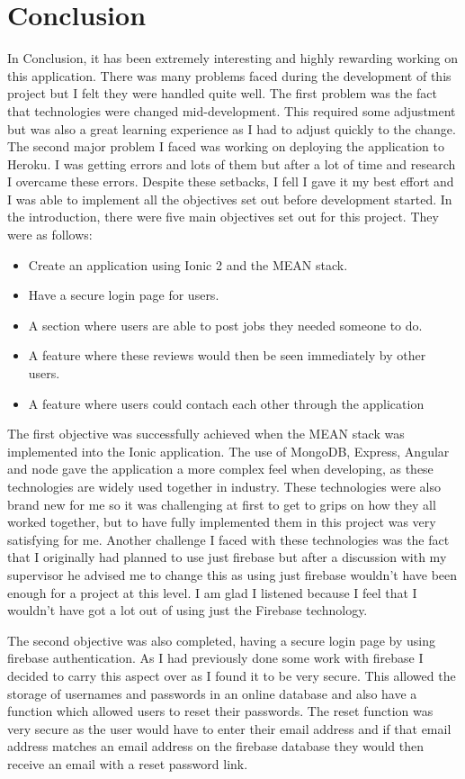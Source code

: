 \chapter{Conclusion}
In Conclusion, it has been extremely interesting and highly rewarding working on this application. There was many problems faced during the development of this project but I felt they were handled  quite well. The first problem was the fact that technologies were changed mid-development. This required some adjustment but was also a great learning experience as I had to adjust quickly to the change. The second major problem I faced was working on deploying the application to Heroku. I was getting errors and lots of them but after a lot of time and research I overcame these errors. Despite these setbacks, I fell I gave it my best effort and I was able to implement all the objectives set out before development started. In the introduction, there were five main objectives set out for this project. They were as follows:
\begin{itemize}
	\item Create an application using Ionic 2 and the MEAN stack.
	\item Have a secure login page for users.
	\item A section where users are able to post jobs they needed someone to do.
	\item A feature where these reviews would then be seen immediately by other users. 
              \item A feature where users could contach each other through the application
\end{itemize}
The first objective was successfully achieved when the MEAN stack was implemented into the Ionic application. The use of MongoDB, Express, Angular and node gave the application a more complex feel when developing, as these technologies are widely used together in industry. These technologies were also brand new for me so it was challenging at first to get to grips on how they all worked together, but to have fully implemented them in this project was very satisfying for me. Another challenge I faced with these technologies was the fact that I originally had planned to use just firebase but after a discussion with my supervisor he advised me to change this as using just firebase wouldn't have been enough for a project at this level. I am glad I listened because I feel that I wouldn't have got a lot out of using just the Firebase technology.

The second objective was also completed, having a secure login page by using firebase authentication. As I had previously done some work with firebase I decided to carry this aspect over as I found it to be very secure. This allowed the storage of usernames and passwords in an online database and also have a function which allowed users to reset their passwords. The reset function was very secure as the user would have to enter their email address and if that email address matches an email address on the firebase database they would then receive an email with a reset password link.

